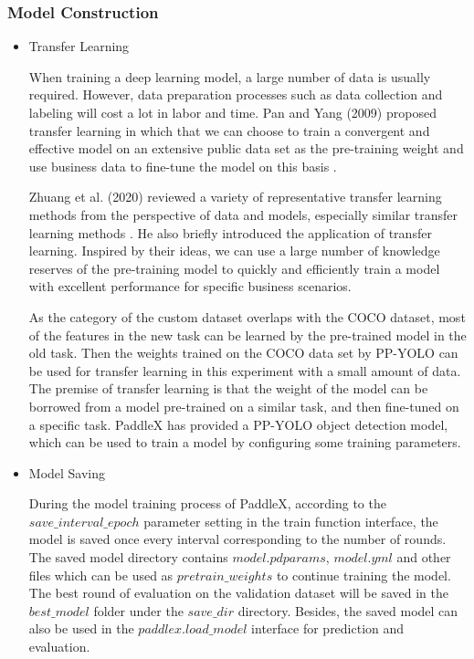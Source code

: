 \documentclass[sensors,article,submit,moreauthors,pdftex]{Definitions/mdpi}
\begin{document}
\begin{paracol}{2}
\linenumbers
\switchcolumn


\subsubsection{Model Construction}

\begin{itemize}
\item{Transfer Learning}

When training a deep learning model, a large number of data is usually required. However, data preparation processes such as data collection and labeling will cost a lot in labor and time.
Pan and Yang (2009) proposed transfer learning in which that we can choose to train a convergent and effective model on an extensive public data set as the pre-training weight and use business data to fine-tune the model on this basis \cite{pan2009survey}.

Zhuang et al. (2020) reviewed a variety of representative transfer learning methods from the perspective of data and models, especially similar transfer learning methods \cite{zhuang2020comprehensive}. He also briefly introduced the application of transfer learning.
Inspired by their ideas, we can use a large number of knowledge reserves of the pre-training model to quickly and efficiently train a model with excellent performance for specific business scenarios.

 As the category of the custom dataset overlaps with the COCO dataset, most of the features in the new task can be learned by the pre-trained model in the old task. Then the weights trained on the COCO data set by PP-YOLO can be used for transfer learning in this experiment with a small amount of data. The premise of transfer learning is that the weight of the model can be borrowed from a model pre-trained on a similar task, and then fine-tuned on a specific task. PaddleX has provided a PP-YOLO object detection model, which can be used to train a model by configuring some training parameters.

\end{itemize}


\begin{itemize}
\item{Model Saving}

During the model training process of PaddleX, according to the $save\_interval\_epoch$ parameter setting in the train function interface, the model is saved once every interval corresponding to the number of rounds. The saved model directory contains $model.pdparams$, $model.yml$ and other files which can be used as $pretrain\_weights$ to continue training the model. The best round of evaluation on the validation dataset will be saved in the $best\_model$ folder under the $save\_dir$ directory. Besides, the saved model can also be used in the $paddlex.load\_model$ interface for prediction and evaluation.
\end{itemize}


\end{paracol}
\end{document}
